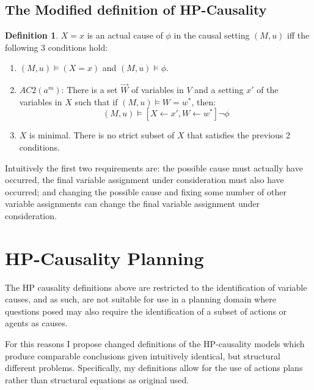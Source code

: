 \documentclass{article}
\theoremstyle{plain}
\theoremstyle{definition}
\newtheorem{defn}[thm]{Definition} %
\begin{document}
\subsection{The Modified definition of HP-Causality}
\begin{defn}$X=x$ is an actual cause of $\phi$ in the causal setting $(M,u)$ iff the following 3 conditions hold:
\begin{enumerate}
\item $(M,u) \models (X=x)$ and $(M,u) \models \phi$.
\item $AC2(a^m)$: There is a set $\vec{W}$ of variables in $V$ and a setting $x'$ of the variables in $X$ such that if $(M,u) \models W = w^*$, then:
\[
(M,u) \models [X \leftarrow x', W \leftarrow w^*] \neg \phi
\]
\item $X$ is minimal. There is no strict subset of $X$ that satisfies the previous 2 conditions.
\end{enumerate}

\end{defn}

Intuitively the first two requirements are: the possible cause must actually have occurred, the final variable assignment under consideration must also have occurred; and changing the possible cause and fixing some number of other variable assignments can change the final variable assignment under consideration.




\newpage

\section{HP-Causality Planning}
The HP causality definitions above are restricted to the identification of variable causes, and as such, are not suitable for use in a planning domain where questions posed may also require the identification of a subset of actions or agents as causes.

For this reasons I propose changed definitions of the HP-causality models which produce comparable conclusions given intuitively identical, but structural different problems. Specifically, my definitions allow for the use of actions plans rather than structural equations as original used.
\end{document}
